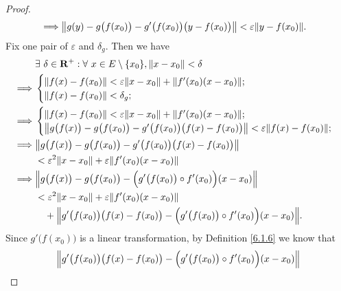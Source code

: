 \begin{proof}
\begin{align*}
        \implies & \norm*{g(y) - g\big(f(x_0)\big) - g'\big(f(x_0)\big)\big(y - f(x_0)\big)} < \varepsilon \norm*{y - f(x_0)}.
    \end{align*}
    Fix one pair of \(\varepsilon\) and \(\delta_g\).
    Then we have
    \begin{align*}
                 & \exists\ \delta \in \mathbf{R}^+ : \forall\ x \in E \setminus \{x_0\}, \norm*{x - x_0} < \delta                    \\
        \implies & \begin{cases}
            \norm*{f(x) - f(x_0)} < \varepsilon \norm*{x - x_0} + \norm*{f'(x_0)(x - x_0)}; \\
            \norm*{f(x) - f(x_0)} < \delta_g;
        \end{cases}                                                                                          \\
        \implies & \begin{cases}
            \norm*{f(x) - f(x_0)} < \varepsilon \norm*{x - x_0} + \norm*{f'(x_0)(x - x_0)}; \\
            \norm*{g\big(f(x)\big) - g\big(f(x_0)\big) - g'\big(f(x_0)\big) \big(f(x) - f(x_0)\big)} < \varepsilon \norm*{f(x) - f(x_0)};
        \end{cases}                                                                                          \\
        \implies & \norm*{g\big(f(x)\big) - g\big(f(x_0)\big) - g'\big(f(x_0)\big) \big(f(x) - f(x_0)\big)}                           \\
                 & < \varepsilon^2 \norm*{x - x_0} + \varepsilon \norm*{f'(x_0)(x - x_0)}                                             \\
        \implies & \norm*{g\big(f(x)\big) - g\big(f(x_0)\big) - \Big(g'\big(f(x_0)\big) \circ f'(x_0)\Big) (x - x_0)}                 \\
                 & < \varepsilon^2 \norm*{x - x_0} + \varepsilon \norm*{f'(x_0)(x - x_0)}                                             \\
                 & \quad + \norm*{g'\big(f(x_0)\big) \big(f(x) - f(x_0)\big) - \Big(g'\big(f(x_0)\big) \circ f'(x_0)\Big) (x - x_0)}.
    \end{align*}
    Since \(g'\big(f(x_0)\big)\) is a linear transformation, by Definition \ref{6.1.6} we know that
    \begin{align*}
         & \norm*{g'\big(f(x_0)\big) \big(f(x) - f(x_0)\big) - \Big(g'\big(f(x_0)\big) \circ f'(x_0)\Big) (x - x_0)} \\

\end{align*}
\end{proof}
